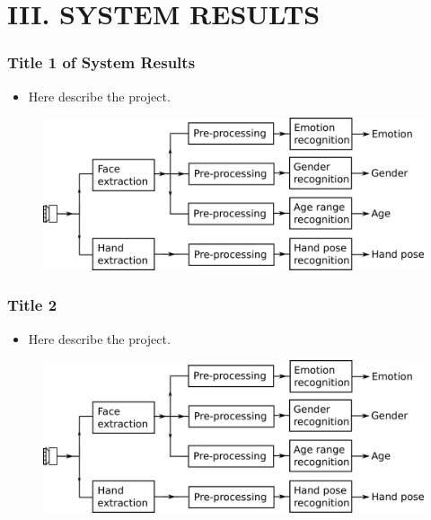 \documentclass{beamer}
\begin{document}
\section{III. SYSTEM RESULTS} 



\begin{frame}\frametitle{Title 1 of System Results}

\begin{itemize}
\item Here describe the project.
\end{itemize}

\begin{figure}
\includegraphics[scale=0.4]{images/diagram.png}
\end{figure}

\end{frame}



\begin{frame}\frametitle{Title 2}

\begin{itemize}
\item Here describe the project.
\end{itemize}

\begin{figure}
\includegraphics[scale=0.4]{images/diagram.png}
\end{figure}

\end{frame}
\end{document}
